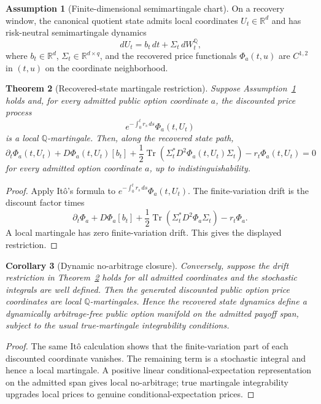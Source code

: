 \documentclass[11pt,a4paper]{amsart}
\theoremstyle{plain}
\newtheorem{theorem}{Theorem}[section]
\newtheorem{corollary}[theorem]{Corollary}
\theoremstyle{definition}
\newtheorem{assumption}[theorem]{Assumption}
\theoremstyle{remark}
\newcommand{\R}{\mathbb{R}}
\newcommand{\QQ}{\mathbb{Q}}
\newcommand{\dd}{\,d}
\begin{document}
\begin{assumption}[Finite-dimensional semimartingale chart]\label{ass:semimartingale-chart}
On a recovery window, the canonical quotient state admits local coordinates \(U_t\in\R^d\) and
has risk-neutral semimartingale dynamics
\[
        \dd U_t=b_t\dd t+\Sigma_t\dd W_t^\QQ,
\]
where \(b_t\in\R^d\), \(\Sigma_t\in\R^{d\times q}\), and the recovered price functionals
\(\Phi_a(t,u)\) are \(C^{1,2}\) in \((t,u)\) on the coordinate neighborhood.
\end{assumption}

\begin{theorem}[Recovered-state martingale restriction]\label{thm:martingale-restriction}
Suppose Assumption~\ref{ass:semimartingale-chart} holds and, for every admitted public option
coordinate \(a\), the discounted price process
\[
        e^{-\int_0^t r_s\dd s}\Phi_a(t,U_t)
\]
is a local \(\QQ\)-martingale.  Then, along the recovered state path,
\[
        \partial_t\Phi_a(t,U_t)
        +
        D\Phi_a(t,U_t)[b_t]
        +
        \frac12
        \operatorname{Tr}\!\left(
        \Sigma_t^\ast D^2\Phi_a(t,U_t)\Sigma_t
        \right)
        -
        r_t\Phi_a(t,U_t)
        =
        0
\]
for every admitted option coordinate \(a\), up to indistinguishability.
\end{theorem}

\begin{proof}
Apply It\^o's formula to \(e^{-\int_0^t r_s\dd s}\Phi_a(t,U_t)\).  The finite-variation drift is
the discount factor times
\[
        \partial_t\Phi_a
        +
        D\Phi_a[b_t]
        +
        \frac12\operatorname{Tr}(\Sigma_t^\ast D^2\Phi_a\Sigma_t)
        -
        r_t\Phi_a .
\]
A local martingale has zero finite-variation drift.  This gives the displayed restriction.
\end{proof}

\begin{corollary}[Dynamic no-arbitrage closure]\label{cor:dynamic-no-arbitrage-closure}
Conversely, suppose the drift restriction in Theorem~\ref{thm:martingale-restriction} holds for
all admitted coordinates and the stochastic integrals are well defined.  Then the generated
discounted public option price coordinates are local \(\QQ\)-martingales.  Hence the recovered
state dynamics define a dynamically arbitrage-free public option manifold on the admitted payoff
span, subject to the usual true-martingale integrability conditions.
\end{corollary}

\begin{proof}
The same It\^o calculation shows that the finite-variation part of each discounted coordinate
vanishes.  The remaining term is a stochastic integral and hence a local martingale.  A positive
linear conditional-expectation representation on the admitted span gives local no-arbitrage; true
martingale integrability upgrades local prices to genuine conditional-expectation prices.
\end{proof}
\end{document}
